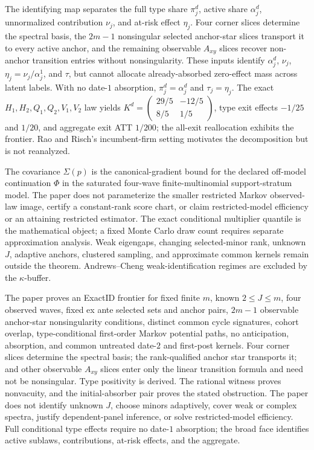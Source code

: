 The identifying map separates the full type share \(\pi_j^d\), active share \(\alpha_j^d\), unnormalized contribution \(\nu_j\), and at-risk effect \(\eta_j\).  Four corner slices determine the spectral basis, the \(2m-1\) nonsingular selected anchor-star slices transport it to every active anchor, and the remaining observable \(A_{xy}\) slices recover non-anchor transition entries without nonsingularity.  These inputs identify \(\alpha_j^d\), \(\nu_j\), \(\eta_j=\nu_j/\alpha_j^1\), and \(\tau\), but cannot allocate already-absorbed zero-effect mass across latent labels.  With no date-\(1\) absorption, \(\pi_j^d=\alpha_j^d\) and \(\tau_j=\eta_j\).  The exact \(H_1,H_2,Q_1,Q_2,V_1,V_2\) law yields \(K^d=\begin{pmatrix}29/5&-12/5\\8/5&1/5\end{pmatrix}\), type exit effects \(-1/25\) and \(1/20\), and aggregate exit ATT \(1/200\); the all-exit reallocation exhibits the frontier.  Rao and Risch's incumbent-firm setting motivates the decomposition but is not reanalyzed.

The covariance \(\Sigma(p)\) is the canonical-gradient bound for the declared off-model continuation \(\Phi\) in the saturated four-wave finite-multinomial support-stratum model.  The paper does not parameterize the smaller restricted Markov observed-law image, certify a constant-rank score chart, or claim restricted-model efficiency or an attaining restricted estimator.  The exact conditional multiplier quantile is the mathematical object; a fixed Monte Carlo draw count requires separate approximation analysis.  Weak eigengaps, changing selected-minor rank, unknown \(J\), adaptive anchors, clustered sampling, and approximate common kernels remain outside the theorem.  Andrews--Cheng weak-identification regimes are excluded by the \(\kappa\)-buffer.

The paper proves an ExactID frontier for fixed finite \(m\), known \(2\leq J\leq m\), four observed waves, fixed ex ante selected sets and anchor pairs, \(2m-1\) observable anchor-star nonsingularity conditions, distinct common cycle signatures, cohort overlap, type-conditional first-order Markov potential paths, no anticipation, absorption, and common untreated date-\(2\) and first-post kernels.  Four corner slices determine the spectral basis; the rank-qualified anchor star transports it; and other observable \(A_{xy}\) slices enter only the linear transition formula and need not be nonsingular.  Type positivity is derived.  The rational witness proves nonvacuity, and the initial-absorber pair proves the stated obstruction.  The paper does not identify unknown \(J\), choose minors adaptively, cover weak or complex spectra, justify dependent-panel inference, or solve restricted-model efficiency.  Full conditional type effects require no date-\(1\) absorption; the broad face identifies active sublaws, contributions, at-risk effects, and the aggregate.

